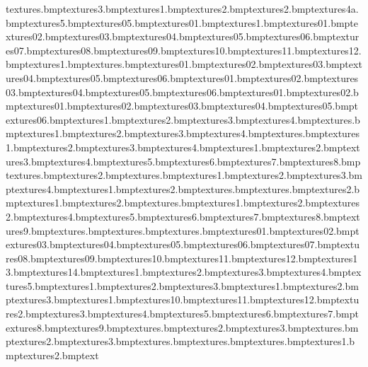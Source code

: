 textures\piano.bmp textures\piano3.bmp textures\strings1.bmp textures\strings2.bmp textures\piano2.bmp textures\piano4a.bmp textures\piano5.bmp textures\purprok05.bmp textures\jhuthatch01.bmp textures\clangersign1.bmp textures\anvilhuge01.bmp textures\anvilhuge02.bmp textures\anvilhuge03.bmp textures\anvilhuge04.bmp textures\anvilhuge05.bmp textures\anvilhuge06.bmp textures\anvilhuge07.bmp textures\anvilhuge08.bmp textures\anvilhuge09.bmp textures\anvilhuge10.bmp textures\anvilhuge11.bmp textures\anvilhuge12.bmp textures\arch1.bmp textures\arrow.bmp textures\blucage01.bmp textures\blucage02.bmp textures\blucage03.bmp textures\blucage04.bmp textures\blucage05.bmp textures\blucage06.bmp textures\bluhut01.bmp textures\bluhut02.bmp textures\bluhut03.bmp textures\bluhut04.bmp textures\bluhut05.bmp textures\bluhut06.bmp textures\bluhutdoor01.bmp textures\bluhutdoor02.bmp textures\bluhutwin01.bmp textures\bluhutwin02.bmp textures\bluhutwin03.bmp textures\bluhutwin04.bmp textures\bluhutwin05.bmp textures\bluhutwin06.bmp textures\bridge1.bmp textures\bridge2.bmp textures\bridge3.bmp textures\bridge4.bmp textures\bridgeside.bmp textures\bridgesnow1.bmp textures\bridgesnow2.bmp textures\bridgesnow3.bmp textures\bridgesnow4.bmp textures\bridsidextra.bmp textures\bridsnowedge1.bmp textures\bridsnowedge2.bmp textures\bridsnowedge3.bmp textures\bridsnowedge4.bmp textures\browtree1.bmp textures\browtree2.bmp textures\browtree3.bmp textures\browtree4.bmp textures\browtree5.bmp textures\browtree6.bmp textures\browtree7.bmp textures\browtree8.bmp textures\burgersign.bmp textures\burgersign2.bmp textures\cagebars.bmp textures\cagedoor1.bmp textures\cagedoor2.bmp textures\cagedoor3.bmp textures\cagedoor4.bmp textures\carzywall1.bmp textures\carzywall2.bmp textures\chickleg.bmp textures\antanae.bmp textures\clangersign2.bmp textures\cornerwall1.bmp textures\cornerwall2.bmp textures\crackwile.bmp textures\creamwall1.bmp textures\creamwall2.bmp textures\dangeranvils2.bmp textures\dangeranvils4.bmp textures\dangeranvils5.bmp textures\dangeranvils6.bmp textures\dangeranvils7.bmp textures\dangeranvils8.bmp textures\dangeranvils9.bmp textures\dangercross.bmp textures\dangertarget.bmp textures\dangertargetsand.bmp textures\dirttosand01.bmp textures\dirttosand02.bmp textures\dirttosand03.bmp textures\dirttosand04.bmp textures\dirttosand05.bmp textures\dirttosand06.bmp textures\dirttosand07.bmp textures\dirttosand08.bmp textures\dirttosand09.bmp textures\dirttosand10.bmp textures\dirttosand11.bmp textures\dirttosand12.bmp textures\dirttosand13.bmp textures\dirttosand14.bmp textures\earth1.bmp textures\earth2.bmp textures\earth3.bmp textures\earth4.bmp textures\earth5.bmp textures\eartskel1.bmp textures\eartskel2.bmp textures\eartskel3.bmp textures\elecbox1.bmp textures\elecbox2.bmp textures\elecbox3.bmp textures\elechut1.bmp textures\elechut10.bmp textures\elechut11.bmp textures\elechut12.bmp textures\elechut2.bmp textures\elechut3.bmp textures\elechut4.bmp textures\elechut5.bmp textures\elechut6.bmp textures\elechut7.bmp textures\elechut8.bmp textures\elechut9.bmp textures\fence.bmp textures\fence2.bmp textures\fence3.bmp textures\fencesnow.bmp textures\fencesnow2.bmp textures\fencesnow3.bmp textures\flash.bmp textures\grass.bmp textures\grasscracks.bmp textures\grassedge1.bmp textures\grassedge2.bmp text